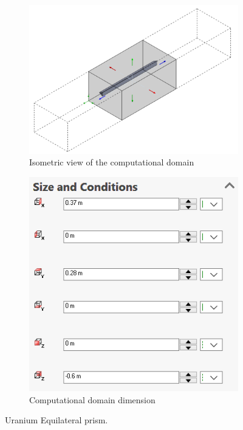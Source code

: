 \documentclass[a4paper,11pt,onecolumn]{article}
\begin{document}
\begin{figure}[ht!]
\centering
\label{fig:12}
\begin{subfigure}{.45\textwidth}
  \centering
  \includegraphics[width=\linewidth]{q12a.png}
  \caption{Isometric view of the computational domain}
\end{subfigure}
\begin{subfigure}{.45\textwidth}
  \centering
  \includegraphics[width=.7\linewidth]{q12ii.png}
  \caption{Computational domain dimension}
\end{subfigure}
\caption{Uranium Equilateral prism.}
\end{figure}
\end{document}
